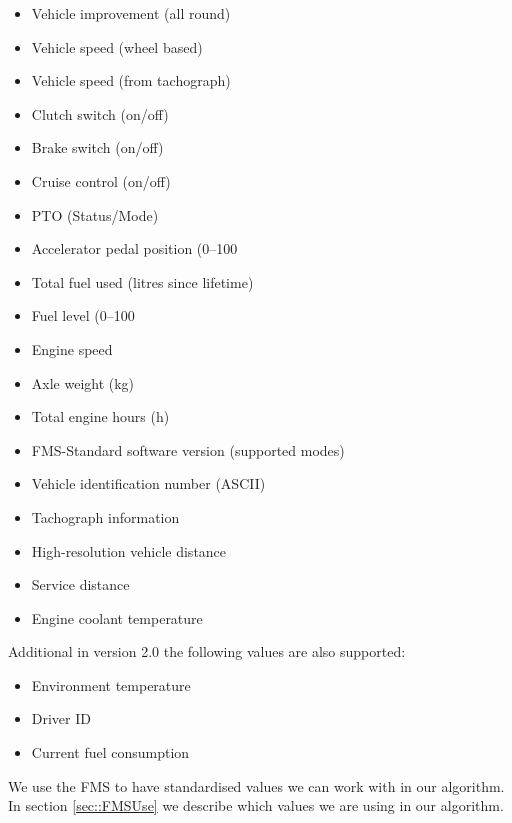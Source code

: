 \begin{itemize}
    \item Vehicle improvement (all round)
    \item Vehicle speed (wheel based)
    \item Vehicle speed (from tachograph)
    \item Clutch switch (on/off)
    \item Brake switch (on/off)
    \item Cruise control (on/off)
    \item PTO (Status/Mode)
    \item Accelerator pedal position (0–100%
    \item Total fuel used (litres since lifetime)
    \item Fuel level (0–100%
    \item Engine speed
    \item Axle weight (kg)
    \item Total engine hours (h)
    \item FMS-Standard software version (supported modes)
    \item Vehicle identification number (ASCII)
    \item Tachograph information
    \item High-resolution vehicle distance
    \item Service distance
    \item Engine coolant temperature
\end{itemize}

Additional in version 2.0 the following values are also supported:
\begin{itemize}
    \item Environment temperature
    \item Driver ID
    \item Current fuel consumption
\end{itemize}

We use the FMS to have standardised values we can work with in our algorithm. In section \ref{sec::FMSUse} we describe which values we are using in our algorithm.


\clearpage